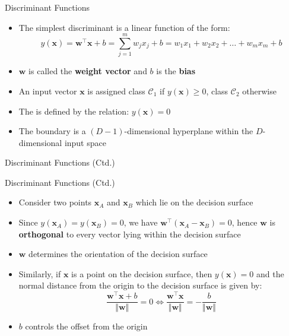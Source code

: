 \begin{frame}{Discriminant Functions}{}
	\begin{itemize}
		\item The simplest discriminant is a linear function of the form:
		\begin{equation}
			y(\bm{x})
				= \bm{w}^{\intercal} \bm{x} + b
				= \sum_{j=1}^m w_j x_j + b
				= w_1 x_1 + w_2 x_2 + \dots + w_m x_m + b
		\end{equation} 
		\item $\bm{w}$ is called the \textbf{weight vector} and $b$ is the \textbf{bias}
		\item An input vector $\bm{x}$ is assigned class $\mathcal{C}_1$ if $y(\bm{x}) \ge 0$,
			class $\mathcal{C}_2$ otherwise
		\item The  is defined by the relation: $y(\bm{x}) = 0$
		\item The boundary is a $(D - 1)$-dimensional hyperplane within the $D$-dimensional input space
	\end{itemize}
\end{frame}


\begin{frame}{Discriminant Functions (Ctd.)}{}
	\vspace*{-2mm}
	
\end{frame}


\begin{frame}{Discriminant Functions (Ctd.)}{}
	\begin{itemize}
		\item Consider two points $\bm{x}_A$ and $\bm{x}_B$ which lie on the decision surface
		\item Since $y(\bm{x}_A) = y(\bm{x}_B) = 0$, we have $\bm{w}^{\intercal}(\bm{x}_A - \bm{x}_B) = 0$,
			hence $\bm{w}$ is \textbf{orthogonal} to every vector lying within the decision surface
		\item $\bm{w}$ determines the orientation of the decision surface
		\item Similarly, if $\bm{x}$ is a point on the decision surface, then $y(\bm{x}) = 0$ and the normal distance from the
			origin to the decision surface is given by:
		\begin{equation}
			\frac{\bm{w}^{\intercal} \bm{x} + b}{\Vert \bm{w} \Vert} = 0 \Leftrightarrow
			\frac{\bm{w}^{\intercal} \bm{x}}{\Vert \bm{w} \Vert} = -\frac{b}{\Vert \bm{w} \Vert}
		\end{equation}
		\item $b$ controls the offset from the origin
	\end{itemize}
\end{frame}


